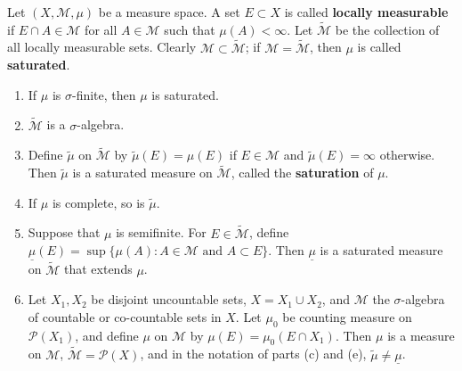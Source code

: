 \documentclass[12pt,a4paper]{article}
\begin{document}
\begin{problem}\label{prob:1-16}
Let $(X, \mathcal{M}, \mu)$ be a measure space. A set $E \subset X$ is called \textbf{locally measurable} if $E \cap A \in \mathcal{M}$ for all $A \in \mathcal{M}$ such that $\mu(A) < \infty$. Let $\tilde{\mathcal{M}}$ be the collection of all locally measurable sets. Clearly $\mathcal{M} \subset \tilde{\mathcal{M}}$; if $\mathcal{M} = \tilde{\mathcal{M}}$, then $\mu$ is called \textbf{saturated}.
\begin{enumerate}[label=\alph*.]
    \item If $\mu$ is $\sigma$-finite, then $\mu$ is saturated.
    \item $\tilde{\mathcal{M}}$ is a $\sigma$-algebra.
    \item Define $\tilde{\mu}$ on $\tilde{\mathcal{M}}$ by $\tilde{\mu}(E) = \mu(E)$ if $E \in \mathcal{M}$ and $\tilde{\mu}(E) = \infty$ otherwise. Then $\tilde{\mu}$ is a saturated measure on $\tilde{\mathcal{M}}$, called the \textbf{saturation} of $\mu$.
    \item If $\mu$ is complete, so is $\tilde{\mu}$.
    \item Suppose that $\mu$ is semifinite. For $E \in \tilde{\mathcal{M}}$, define $\underline{\mu}(E) = \sup\{\mu(A) : A \in \mathcal{M} \text{ and } A \subset E\}$. Then $\underline{\mu}$ is a saturated measure on $\tilde{\mathcal{M}}$ that extends $\mu$.
    \item Let $X_1, X_2$ be disjoint uncountable sets, $X = X_1 \cup X_2$, and $\mathcal{M}$ the $\sigma$-algebra of countable or co-countable sets in $X$. Let $\mu_0$ be counting measure on $\mathcal{P}(X_1)$, and define $\mu$ on $\mathcal{M}$ by $\mu(E) = \mu_0(E \cap X_1)$. Then $\mu$ is a measure on $\mathcal{M}$, $\tilde{\mathcal{M}} = \mathcal{P}(X)$, and in the notation of parts (c) and (e), $\tilde{\mu} \ne \underline{\mu}$.
\end{enumerate}
\end{problem}
\end{document}
